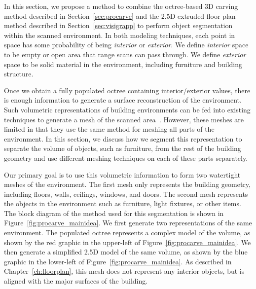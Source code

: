 \documentclass[12pt,onecolumn,oneside]{book}
\begin{document}
In this section, we propose a method to combine the octree-based 3D carving method described in Section~\ref{sec:procarve} and the 2.5D extruded floor plan method described in Section~\ref{sec:visigrapp} to perform object segmentation within the scanned environment.  In both modeling techniques, each point in space has some probability of being {\it interior} or {\it exterior}.  We define {\it interior} space to be empty or open area that range scans can pass through.  We define {\it exterior} space to be solid material in the environment, including furniture and building structure.

Once we obtain a fully populated octree containing interior/exterior values, there is enough information to generate a surface reconstruction of the environment.  Such volumetric representations of building environments can be fed into existing techniques to generate a mesh of the scanned area~\cite{Turner13,Kintinuous,Carving}.  However, these meshes are limited in that they use the same method for meshing all parts of the environment.  In this section, we discuss how we segment this representation to separate the volume of objects, such as furniture, from the rest of the building geometry and use different meshing techniques on each of these parts separately.

Our primary goal is to use this volumetric information to form two watertight meshes of the environment.  The first mesh only represents the building geometry, including floors, walls, ceilings, windows, and doors.  The second mesh represents the objects in the environment such as furniture, light fixtures, or other items.  The block diagram of the method used for this segmentation is shown in Figure~\ref{fig:procarve_mainidea}.  We first generate two representations of the same environment.  The populated octree represents a complex model of the volume, as shown by the red graphic in the upper-left of Figure~\ref{fig:procarve_mainidea}.  We then generate a simplified 2.5D model of the same volume, as shown by the blue graphic in the lower-left of Figure~\ref{fig:procarve_mainidea}.  As described in Chapter~\ref{ch:floorplan}, this mesh does not represent any interior objects, but is aligned with the major surfaces of the building.
\end{document}
